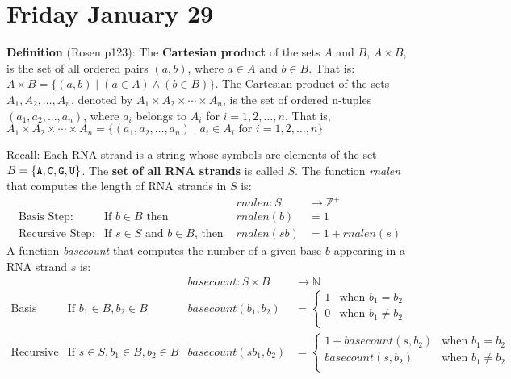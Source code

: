 \documentclass[12pt, oneside]{article}
\begin{document}
\vfill

\section*{Friday January 29}


{\bf Definition} (Rosen p123): The {\bf Cartesian product} of the sets $A$ and $B$, $A \times B$, is the set of all ordered pairs $(a, b)$, where $a \in A$ and $b \in B$. 
That is: $A \times B = \{(a, b) \mid (a \in A) \land (b \in B)\}.$ The Cartesian product of the sets $A_1, A_2, \ldots ,A_n$, denoted by $A_1 \times A_2 \times \cdots \times A_n$, is the
set of ordered n-tuples $(a_1, a_2,...,a_n)$, where $a_i$ belongs to $A_i$ for $i = 1, 2,\ldots,n$. That is,
$A_1 \times A_2 \times \cdots \times A_n = \{(a_1, a_2,\ldots,a_n) \mid a_i \in A_i \textrm{ for } i = 1, 2,\ldots,n\}$



Recall: Each RNA strand is a string whose symbols are elements of the set $B  = \{\texttt{A}, \texttt{C}, \texttt{G}, \texttt{U} \}$.
The {\bf set of all RNA strands} is called $S$.
The function \textit{rnalen} that computes the length of RNA strands in $S$ is:
\[
\begin{array}{llll}
& & \textit{rnalen} : S & \to \mathbb{Z}^+ \\
\textrm{Basis Step:} & \textrm{If } b \in B\textrm{ then } & \textit{rnalen}(b) & = 1 \\
\textrm{Recursive Step:} & \textrm{If } s \in S\textrm{ and }b \in B\textrm{, then  } & \textit{rnalen}(sb) & = 1 + \textit{rnalen}(s)
\end{array}
\]
A function \textit{basecount} that computes the number of a given base $b$ appearing in a RNA strand $s$ is:
\[
\begin{array}{llll}
& & \textit{basecount} : S \times B & \to \mathbb{N} \\
\textrm{Basis Step:} &  \textrm{If } b_1 \in B, b_2 \in B & \textit{basecount}(b_1, b_2) & =
        \begin{cases}
            1 & \textrm{when } b_1 = b_2 \\
            0 & \textrm{when } b_1 \neq b_2 \\
        \end{cases} \\
\textrm{Recursive Step:} & \textrm{If } s \in S, b_1 \in B, b_2 \in B &\textit{basecount}(s b_1, b_2) & =
        \begin{cases}
            1 + \textit{basecount}(s, b_2) & \textrm{when } b_1 = b_2 \\
            \textit{basecount}(s, b_2) & \textrm{when } b_1 \neq b_2 \\
        \end{cases}
\end{array}
\]
\end{document}
